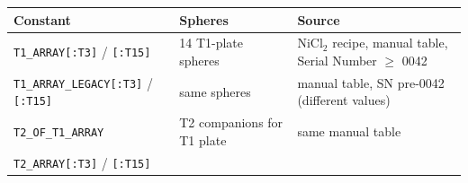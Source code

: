 \begin{longtable}[]{@{}lll@{}}
\toprule
\begin{minipage}[b]{0.34\columnwidth}\raggedright
Constant\strut
\end{minipage} & \begin{minipage}[b]{0.30\columnwidth}\raggedright
Spheres\strut
\end{minipage} & \begin{minipage}[b]{0.27\columnwidth}\raggedright
Source\strut
\end{minipage}\tabularnewline
\midrule
\endhead
\begin{minipage}[t]{0.34\columnwidth}\raggedright
\texttt{T1\_ARRAY{[}:T3{]}} / \texttt{{[}:T15{]}}\strut
\end{minipage} & \begin{minipage}[t]{0.30\columnwidth}\raggedright
14 T1-plate spheres\strut
\end{minipage} & \begin{minipage}[t]{0.27\columnwidth}\raggedright
NiCl\(_2\) recipe, manual table, Serial Number \(\geq\) 0042\strut
\end{minipage}\tabularnewline
\begin{minipage}[t]{0.34\columnwidth}\raggedright
\texttt{T1\_ARRAY\_LEGACY{[}:T3{]}} / \texttt{{[}:T15{]}}\strut
\end{minipage} & \begin{minipage}[t]{0.30\columnwidth}\raggedright
same spheres\strut
\end{minipage} & \begin{minipage}[t]{0.27\columnwidth}\raggedright
manual table, SN pre-0042 (different values)\strut
\end{minipage}\tabularnewline
\begin{minipage}[t]{0.34\columnwidth}\raggedright
\texttt{T2\_OF\_T1\_ARRAY}\strut
\end{minipage} & \begin{minipage}[t]{0.30\columnwidth}\raggedright
T2 companions for T1 plate\strut
\end{minipage} & \begin{minipage}[t]{0.27\columnwidth}\raggedright
same manual table\strut
\end{minipage}\tabularnewline
\begin{minipage}[t]{0.34\columnwidth}\raggedright
\texttt{T2\_ARRAY{[}:T3{]}} / \texttt{{[}:T15{]}}\strut
\end{minipage} & \begin{minipage}[t]{0.30\columnwidth}\raggedright

\end{minipage}
\end{longtable}
